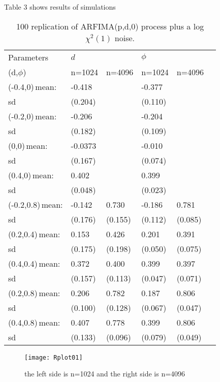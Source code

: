 \documentclass[10pt,a4paper]{article}
\begin{document}
Table 3 shows results of simulations
\begin{table}[!hbp]
\centering
\begin{tabular}{llllll}
\hline
\hline
Parameters & $d$ & $\,$ & $\phi$ & \, \\
(d,$\phi$)& n=1024& n=4096 & n=1024 & n=4096\\
\hline
(-0.4,0)\,mean:&-0.418&\,&-0.377&\,\\
sd&(0.204)&\,&(0.110)&\,\\
(-0.2,0)\,mean:&-0.206&\,&-0.204&\,\\
sd&(0.182)&\,&(0.109)&\,\\
(0,0)\,mean:&-0.0373&\,&-0.010&\,\\
sd&(0.167)&\,&(0.074)&\,\\
(0.4,0)\,mean:&0.402&\,&0.399&\,\\
sd&(0.048)&\,&(0.023)&\,\\
(-0.2,0.8)\,mean:&-0.142&0.730&-0.186& 0.781\\
sd&(0.176)&(0.155)&(0.112)&(0.085)\\
(0.2,0.4)\,mean:& 0.153&0.426& 0.201& 0.391\\
sd&(0.175)&(0.198)&(0.050)&(0.075)\\
(0.4,0.4)\,mean:& 0.372&0.400& 0.399& 0.397\\
sd&(0.157)&(0.113)&(0.047)&(0.071)\\
(0.2,0.8)\,mean:& 0.206&0.782& 0.187& 0.806\\
sd&(0.100)&(0.128)&(0.067)&(0.047)\\
(0.4,0.8)\,mean:& 0.407 & 0.778& 0.399 & 0.806\\
sd&(0.133)&(0.096)&(0.079)&(0.049)\\
\hline
\end{tabular}
\caption{100 replication of ARFIMA(p,d,0) process plus a log $\chi^2(1)$ noise.
}
\end{table}

\begin{figure}[!htb]
\centering
\texttt{[image: Rplot01]}
\caption{the left side is n=1024 and the right side is n=4096}
\end{figure}
\end{document}
